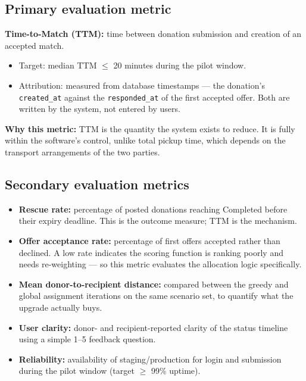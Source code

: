\documentclass[11pt,a4paper]{article}
\begin{document}
\subsection{Primary evaluation metric}
\textbf{Time-to-Match (TTM):} time between donation submission and creation of an accepted match.
\begin{itemize}[leftmargin=0.7cm]
    \item Target: median TTM $\le$ 20 minutes during the pilot window.
    \item Attribution: measured from database timestamps --- the donation's \texttt{created\_at} against the \texttt{responded\_at} of the first accepted offer. Both are written by the system, not entered by users.
\end{itemize}
\textbf{Why this metric:} TTM is the quantity the system exists to reduce. It is fully within the software's control, unlike total pickup time, which depends on the transport arrangements of the two parties.

\subsection{Secondary evaluation metrics}
\begin{itemize}[leftmargin=0.7cm]
    \item \textbf{Rescue rate:} percentage of posted donations reaching Completed before their expiry deadline. This is the outcome measure; TTM is the mechanism.
    \item \textbf{Offer acceptance rate:} percentage of first offers accepted rather than declined. A low rate indicates the scoring function is ranking poorly and needs re-weighting --- so this metric evaluates the allocation logic specifically.
    \item \textbf{Mean donor-to-recipient distance:} compared between the greedy and global assignment iterations on the same scenario set, to quantify what the upgrade actually buys.
    \item \textbf{User clarity:} donor- and recipient-reported clarity of the status timeline using a simple 1--5 feedback question.
    \item \textbf{Reliability:} availability of staging/production for login and submission during the pilot window (target $\ge$ 99\% uptime).
\end{itemize}
\end{document}
